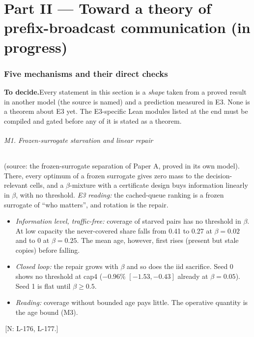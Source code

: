 \documentclass[11pt]{article}
\theoremstyle{definition}
\newif\ifshownotes\shownotestrue
\newcommand{\NOTE}[1]{\ifshownotes{\color{notecol}\,\textsf{\footnotesize[N: #1]}}\fi}
\newcommand{\TODOPAR}[1]{\ifshownotes\par\vspace{2pt}\noindent%
  {\color{todocol}\textsf{\footnotesize\textbf{To decide.}\;#1}}\par\vspace{2pt}\fi}
\begin{document}
\part*{Part II --- Toward a theory of prefix-broadcast communication (in progress)}

\section{Five mechanisms and their direct checks}\label{sec:theory}
\TODOPAR{Every statement in this section is a \emph{shape} taken from a proved result in another model (the source is
named) and a prediction measured in E3. None is a theorem about E3 yet. The E3-specific Lean modules listed at the end
must be compiled and gated before any of it is stated as a theorem.}

\paragraph{M1. Frozen-surrogate starvation and linear repair} (source: the frozen-surrogate separation of Paper A, proved
in its own model). There, every optimum of a frozen surrogate gives zero mass to the decision-relevant cells, and a
$\beta$-mixture with a certificate design buys information linearly in $\beta$, with no threshold. \emph{E3 reading:} the
cached-queue ranking is a frozen surrogate of ``who matters'', and rotation is the repair.
\begin{itemize}
\item \emph{Information level, traffic-free:} coverage of starved pairs has no threshold in $\beta$. At low capacity the
never-covered share falls from 0.41 to 0.27 at $\beta=0.02$ and to 0 at $\beta=0.25$. The mean age, however, first rises
(present but stale copies) before falling.
\item \emph{Closed loop:} the repair grows with $\beta$ and so does the iid sacrifice. Seed 0 shows no threshold at cap4
($-0.96\%$ $[-1.53,-0.43]$ already at $\beta=0.05$). Seed 1 is flat until $\beta\ge0.5$.
\item \emph{Reading:} coverage without bounded age pays little. The operative quantity is the age bound (M3).
\end{itemize}
\NOTE{L-176, L-177.}
\end{document}
